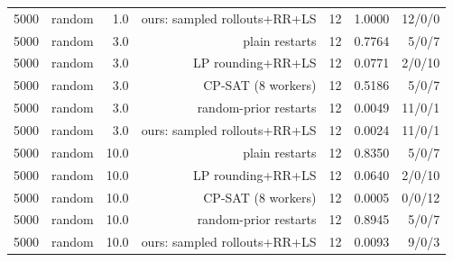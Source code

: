 \begin{table}[t]
\begin{tabular}{llrrrrr}
5000 & random & 1.0 & ours: sampled rollouts+RR+LS & 12 & 1.0000 & 12/0/0 \\
5000 & random & 3.0 & plain restarts & 12 & 0.7764 & 5/0/7 \\
5000 & random & 3.0 & LP rounding+RR+LS & 12 & 0.0771 & 2/0/10 \\
5000 & random & 3.0 & CP-SAT (8 workers) & 12 & 0.5186 & 5/0/7 \\
5000 & random & 3.0 & random-prior restarts & 12 & 0.0049 & 11/0/1 \\
5000 & random & 3.0 & ours: sampled rollouts+RR+LS & 12 & 0.0024 & 11/0/1 \\
5000 & random & 10.0 & plain restarts & 12 & 0.8350 & 5/0/7 \\
5000 & random & 10.0 & LP rounding+RR+LS & 12 & 0.0640 & 2/0/10 \\
5000 & random & 10.0 & CP-SAT (8 workers) & 12 & 0.0005 & 0/0/12 \\
5000 & random & 10.0 & random-prior restarts & 12 & 0.8945 & 5/0/7 \\
5000 & random & 10.0 & ours: sampled rollouts+RR+LS & 12 & 0.0093 & 9/0/3 \\
\bottomrule
\end{tabular}
\end{table}

